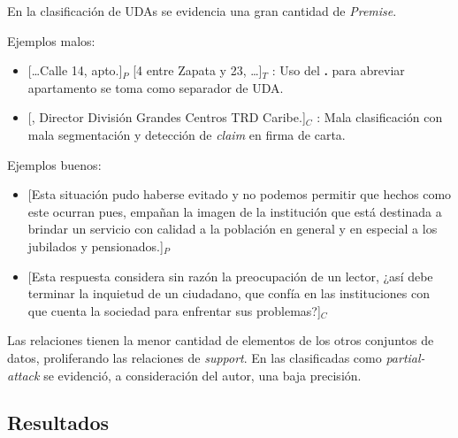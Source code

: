 \documentclass[a4paper,11pt,twocolumn,twoside]{article}
\begin{document}
En la clasificación de UDAs se evidencia una gran cantidad de \textit{Premise}.

Ejemplos malos:
\begin{itemize}
	\item \text{} [\dots Calle 14, apto.]$_P$ [4 entre Zapata y 23, \dots]$_T$
	      : Uso del \textbf{.} para abreviar apartamento se toma como separador de UDA. %
	\item \text{} [, Director División Grandes Centros TRD Caribe.]$_C$
	      : Mala clasificación con mala segmentación y detección de \textit{claim} en firma de carta. 
\end{itemize}

Ejemplos buenos:
\begin{itemize}
	\item \text{} [Esta situación pudo haberse evitado y no podemos permitir que hechos como este ocurran pues,
		      empañan la imagen de la institución que está destinada a brindar un servicio con calidad a la población en 
		      general y en especial a los jubilados y pensionados.]$_P$ %
	\item \text{} [Esta respuesta considera sin razón la preocupación de un lector,
		      ¿así debe terminar la inquietud de un ciudadano, que confía en las instituciones con que cuenta la 
		      sociedad para enfrentar sus problemas?]$_C$ %
\end{itemize}

Las relaciones tienen la menor cantidad de elementos de los otros conjuntos de datos, proliferando
las relaciones de \textit{support}. En las clasificadas como \textit{partial-attack} se evidenció, a 
consideración del autor, una baja precisión. 

\subsection{Resultados}
\end{document}
